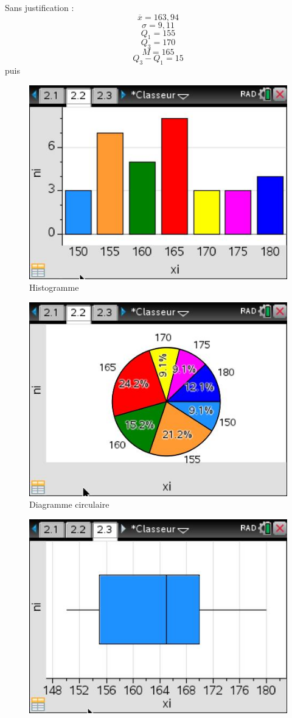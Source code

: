 \begin{exemple}
Sans justification : 
$$\overline{x} = 163,94$$
$$\sigma = 9,11$$
$$Q_1 = 155$$
$$Q_3 = 170$$
$$M = 165$$
$$Q_3-Q_1 = 15$$
puis 
\begin{figure}[H]
\centering
\includegraphics[scale=0.5]{images/recap1.jpg}
\caption{Histogramme}
\end{figure}
\begin{figure}[H]
\centering
\includegraphics[scale=0.5]{images/recap2.jpg}
\caption{Diagramme circulaire}
\end{figure}
\begin{figure}[H]
\centering
\includegraphics[scale=0.5]{images/recap3.jpg}

\end{figure}
\end{exemple}
